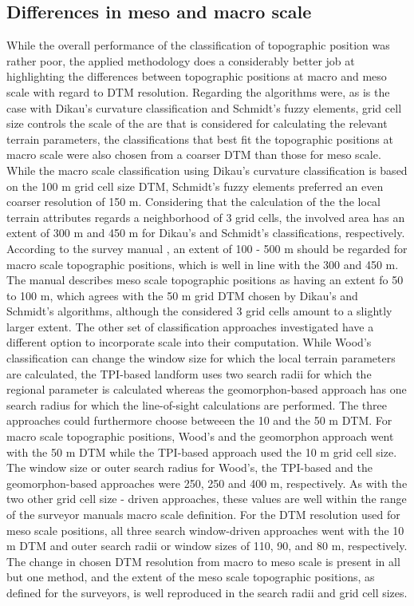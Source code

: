\documentclass[preprint,12pt,authoryear]{elsarticle}
\begin{document}
\subsection{Differences in meso and macro scale}
While the overall performance of the classification of topographic position was rather poor, the applied methodology does a considerably better job at highlighting the differences between topographic positions at macro and meso scale with regard to DTM resolution.
Regarding the algorithms were, as is the case with Dikau's curvature classification and Schmidt's fuzzy elements, grid cell size controls the scale of the are that is considered for calculating the relevant terrain parameters, the classifications that best fit the topographic positions at macro scale were also chosen from a coarser DTM than those for meso scale. While the macro scale classification using Dikau's curvature classification is based on the 100 m grid cell size DTM, Schmidt's fuzzy elements preferred an even coarser resolution of 150 m. Considering that the calculation of the the local terrain attributes regards a neighborhood of 3 grid cells, the involved area has an extent of 300 m and 450 m for Dikau's and Schmidt's classifications, respectively. According to the survey manual \citep{Englisch1998}, an extent of 100 - 500 m should be regarded for macro scale topographic positions, which is well in line with the 300 and 450 m. The manual describes meso scale topographic positions as having an extent fo 50 to 100 m, which agrees with the 50 m grid DTM chosen by Dikau's and Schmidt's algorithms, although the considered 3 grid cells amount to a slightly larger extent.
The other set of classification approaches investigated have a different option to incorporate scale into their computation. While Wood's classification can change the window size for which the local terrain parameters are calculated, the TPI-based landform uses two search radii for which the regional parameter is calculated whereas the geomorphon-based approach has one search radius for which the line-of-sight calculations are performed. The three approaches could furthermore choose betweeen the 10 and the 50 m DTM. For macro scale topographic positions, Wood's and the geomorphon approach went with the 50 m DTM while the TPI-based approach used the 10 m grid cell size. The window size or outer search radius for Wood's, the TPI-based and the geomorphon-based approaches were 250, 250 and 400 m, respectively. As with the two other grid cell size - driven approaches, these values are well within the range of the surveyor manuals macro scale definition. For the DTM resolution used for meso scale positions, all three search window-driven approaches went with the 10 m DTM and outer search radii or window sizes of 110, 90, and 80 m, respectively. The change in chosen DTM resolution from macro to meso scale is present in all but one method, and the extent of the meso scale topographic positions, as defined for the surveyors, is well reproduced in the search radii and grid cell sizes.
\end{document}
